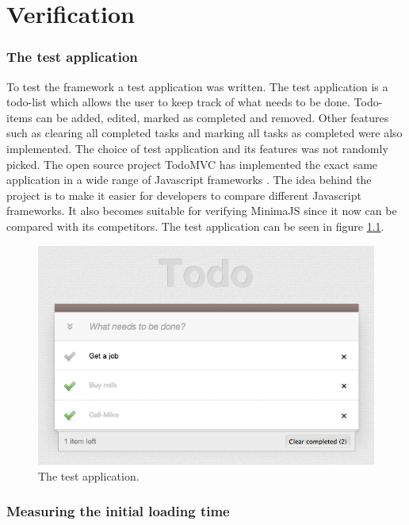 \chapter{Verification}

\setcounter{section}{6}
\setcounter{subsection}{0}

\subsection{The test application}

To test the framework a test application was written. The test application is a todo-list which allows the user to keep track of what needs to be done. Todo-items can be added, edited, marked as completed and removed. Other features such as clearing all completed tasks and marking all tasks as completed were also implemented. The choice of test application and its features was not randomly picked. The open source project TodoMVC has implemented the exact same application in a wide range of Javascript frameworks \cite{todomvc}. The idea behind the project is to make it easier for developers to compare different Javascript frameworks. It also becomes suitable for verifying MinimaJS since it now can be compared with its competitors. The test application can be seen in figure \ref{fig:testapp}.

\begin{figure}[h!]
	\centerline{\includegraphics[width=120mm]{gfx/testapp.png}}
	\caption{The test application.}
	\label{fig:testapp}
\end{figure}

\subsection{Measuring the initial loading time}

